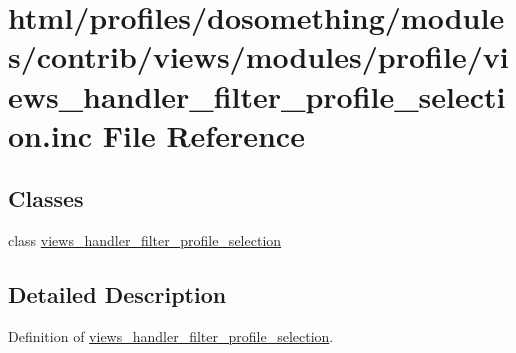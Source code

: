 \hypertarget{views__handler__filter__profile__selection_8inc}{
\section{html/profiles/dosomething/modules/contrib/views/modules/profile/views\_\-handler\_\-filter\_\-profile\_\-selection.inc File Reference}
\label{views__handler__filter__profile__selection_8inc}
}
\subsection*{Classes}
\begin{DoxyCompactItemize}
\item 
class \hyperlink{classviews__handler__filter__profile__selection}{views\_\-handler\_\-filter\_\-profile\_\-selection}
\end{DoxyCompactItemize}


\subsection{Detailed Description}
Definition of \hyperlink{classviews__handler__filter__profile__selection}{views\_\-handler\_\-filter\_\-profile\_\-selection}. 